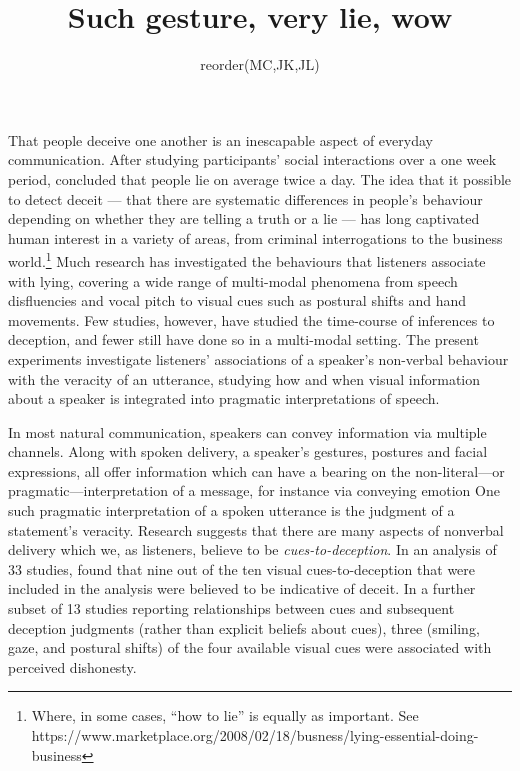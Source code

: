 \documentclass[a4paper,man,natbib]{apa6}
\title{Such gesture, very lie, wow}
\author{reorder(MC,JK,JL)}
\affiliation{Psychology, PPLS, University of Edinburgh}
\newcommand*{\term}[1]{\emph{#1}} %
\begin{document}
\maketitle
\linenumbers
\noindent
That people deceive one another is an inescapable aspect of everyday communication.
After studying participants' social interactions over a one week period, \citet{DePaulo1996} concluded that people lie on average twice a day.
The idea that it possible to detect deceit --- that there are systematic differences in people's behaviour depending on whether they are telling a truth or a lie --- has long captivated human interest in a variety of areas, from criminal interrogations to the business world.\footnote{Where, in some cases, ``how to lie'' is equally as important. See https://www.marketplace.org/2008/02/18/busness/lying-essential-doing-business}
Much research has investigated the behaviours that listeners associate with lying, covering a wide range of multi-modal phenomena from speech disfluencies and vocal pitch to visual cues such as postural shifts and hand movements.
Few studies, however, have studied the time-course of inferences to deception, and fewer still have done so in a multi-modal setting.
The present experiments investigate listeners' associations of a speaker's non-verbal behaviour with the veracity of an utterance, studying how and when visual information about a speaker is integrated into pragmatic interpretations of speech.

In most natural communication, speakers can convey information via multiple channels.
Along with spoken delivery, a speaker's gestures, postures and facial expressions, all offer information which can have a bearing on the non-literal---or pragmatic---interpretation of a message, for instance via conveying emotion \citep{Busso2004, Gregerson2005}
One such pragmatic interpretation of a spoken utterance is the judgment of a statement's veracity.
Research suggests that there are many aspects of nonverbal delivery which we, as listeners, believe to be \term{cues-to-deception}. 
In an analysis of 33 studies, \citet{Zuckerman1981} found that nine out of the ten visual cues-to-deception that were included in the analysis were believed to be indicative of deceit. 
In a further subset of 13 studies reporting relationships between cues and subsequent deception judgments (rather than explicit beliefs about cues), three (smiling, gaze, and postural shifts) of the four available visual cues were associated with perceived dishonesty.
\end{document}
